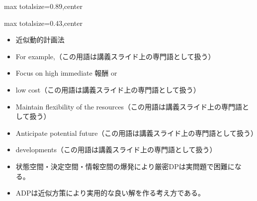 \begin{minipage}[t]{0.58\textwidth}
\begin{adjustbox}{max totalsize={\textwidth}{0.89\textheight},center}
\begin{minipage}{\textwidth}
\end{minipage}
\end{adjustbox}
\end{minipage}


\clearpage
{}
\begin{minipage}[t]{0.405\textwidth}
\begin{adjustbox}{max totalsize={\textwidth}{0.43\textheight},center}
\begin{minipage}{\textwidth}\scriptsize
{}\begin{itemize}
\item 近似動的計画法
\item For example,（この用語は講義スライド上の専門語として扱う）
\item Focus on high immediate 報酬 or
\item low cost（この用語は講義スライド上の専門語として扱う）
\item Maintain flexibility of the resources（この用語は講義スライド上の専門語として扱う）
\item Anticipate potential future（この用語は講義スライド上の専門語として扱う）
\item developments（この用語は講義スライド上の専門語として扱う）
\end{itemize}\begin{itemize}
\item 状態空間・決定空間・情報空間の爆発により厳密DPは実問題で困難になる。
\item ADPは近似方策により実用的な良い解を作る考え方である。
\end{itemize}
\end{minipage}
\end{adjustbox}
\end{minipage}\hfill
